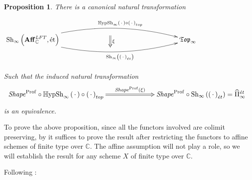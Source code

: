 \documentclass[12pt]{amsart}
\newtheorem{proposition}[dummy]{Proposition}
\theoremstyle{definition}
\newcommand{\bC}{\mathbb{C}}
\newcommand{\Aff}{\mathbf{Aff}^{\mathit{LFT}}_{\mathbb{C}}}
\newcommand{\Sh}{\operatorname{Sh}}
\newcommand{\et}{\acute{e}t}
\renewcommand{\i}{\infty}
\def\Shi{\Sh_\i}
\def\Hshi{\mathbb{H}\mathrm{ypSh}_\i}
\def\blank{\mspace{3mu}\cdot\mspace{3mu}}
\def\Prof{\operatorname{Prof}}
\def\Shape{\mathit{Shape}}
\begin{document}
\begin{proposition}\label{prop: main 1}
There is a canonical natural transformation

$$ \xygraph{!{0;(6.5,0):(0,0.15)::}
{\Shi\left(\Aff,\mbox{\'et}\right)}="a" [r] {\mathfrak{Top}_\i}="b"
"a":@/^{1.5pc}/"b"^-{\Hshi\left(\blank\right)\circ \left(\blank\right)_{top}}|(.4){}="l"
"a":@/_{1.5pc}/"b"_-{\Shi\left(\left(\blank\right)_{\et}\right)}
"l" [d(.3)]  [r(0.1)] :@{=>}^{\xi} [d(.5)]} $$

Such that the induced natural transformation
$$\xymatrix@C=2.5cm{\Shape^{\Prof} \circ \Hshi\left(\blank\right)\circ \left(\blank\right)_{top}  \ar@{=>}[r]^-{\Shape^{\Prof}\left(\xi\right)}& \Shape^{\Prof} \circ \Shi\left(\left(\blank\right)_{\et}\right)=\widehat{\Pi}^{\et}_\i}$$ is an equivalence.
\end{proposition}


To prove the above proposition, since all the functors involved are colimit preserving, by \cite[Proposition 5.5.4.20, Theorem 5.1.5.6]{htt} it suffices to prove the result after restricting the functors to affine schemes of finite type over $\bC.$ The affine assumption will not play a role, so we will establish the result for any scheme $X$ of finite type over $\bC.$

Following \cite[expos\'e XI.4]{SGA4}:
\end{document}
